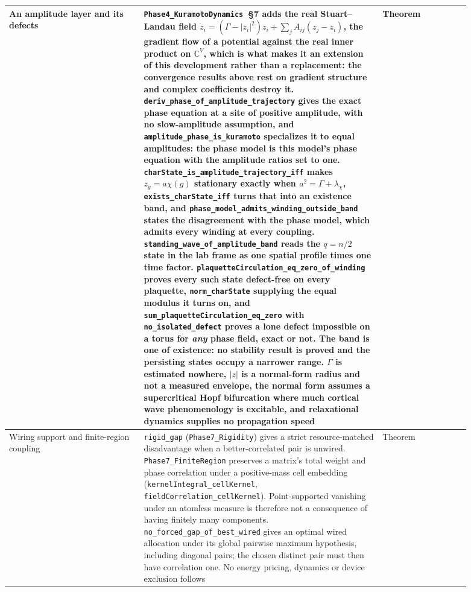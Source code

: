 \documentclass{article}
\begin{document}
\begin{longtable}{|>{\raggedright\arraybackslash}p{0.26\linewidth}|>{\raggedright\arraybackslash}p{0.46\linewidth}|>{\raggedright\arraybackslash}p{0.17\linewidth}|}
An amplitude layer and its defects & \nolinkurl{Phase4_KuramotoDynamics}~\S7 adds the real Stuart--Landau field $\dot z_i=(\Gamma-|z_i|^2)z_i+\sum_j A_{ij}(z_j-z_i)$, the gradient flow of a potential against the real inner product on $\mathbb{C}^V$, which is what makes it an extension of this development rather than a replacement: the convergence results above rest on gradient structure and complex coefficients destroy it. \nolinkurl{deriv_phase_of_amplitude_trajectory} gives the exact phase equation at a site of positive amplitude, with no slow-amplitude assumption, and \nolinkurl{amplitude_phase_is_kuramoto} specializes it to equal amplitudes: the phase model is this model's phase equation with the amplitude ratios set to one. \nolinkurl{charState_is_amplitude_trajectory_iff} makes $z_g=a\chi(g)$ stationary exactly when $a^2=\Gamma+\lambda_\chi$, \nolinkurl{exists_charState_iff} turns that into an existence band, and \nolinkurl{phase_model_admits_winding_outside_band} states the disagreement with the phase model, which admits every winding at every coupling. \nolinkurl{standing_wave_of_amplitude_band} reads the $q=n/2$ state in the lab frame as one spatial profile times one time factor. \nolinkurl{plaquetteCirculation_eq_zero_of_winding} proves every such state defect-free on every plaquette, \nolinkurl{norm_charState} supplying the equal modulus it turns on, and \nolinkurl{sum_plaquetteCirculation_eq_zero} with \nolinkurl{no_isolated_defect} proves a lone defect impossible on a torus for \emph{any} phase field, exact or not. The band is one of existence: no stability result is proved and the persisting states occupy a narrower range. $\Gamma$ is estimated nowhere, $|z|$ is a normal-form radius and not a measured envelope, the normal form assumes a supercritical Hopf bifurcation where much cortical wave phenomenology is excitable, and relaxational dynamics supplies no propagation speed & Theorem \\ \hline
Wiring support and finite-region coupling & \nolinkurl{rigid_gap} (\nolinkurl{Phase7_Rigidity}) gives a strict resource-matched disadvantage when a better-correlated pair is unwired. \nolinkurl{Phase7_FiniteRegion} preserves a matrix's total weight and phase correlation under a positive-mass cell embedding (\nolinkurl{kernelIntegral_cellKernel}, \nolinkurl{fieldCorrelation_cellKernel}). Point-supported vanishing under an atomless measure is therefore not a consequence of having finitely many components. \nolinkurl{no_forced_gap_of_best_wired} gives an optimal wired allocation under its global pairwise maximum hypothesis, including diagonal pairs; the chosen distinct pair must then have correlation one. No energy pricing, dynamics or device exclusion follows & Theorem \\ \hline

\end{longtable}
\end{document}
